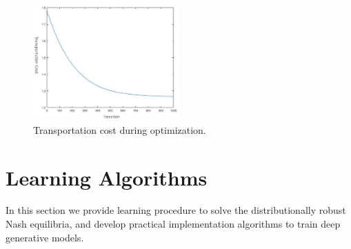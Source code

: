 \documentclass{article}
\begin{document}
\begin{figure}[htb!]
\centering
\includegraphics[width=0.5\textwidth]{FIGDRG/Jw}
\caption{Transportation cost during optimization.}
\label{fig:cost}
\end{figure}


\newpage



\section{Learning Algorithms}
\label{Sec:Learning}

In this section we provide learning procedure to solve the distributionally robust Nash equilibria, and develop practical implementation algorithms to train deep generative models.

\end{document}
